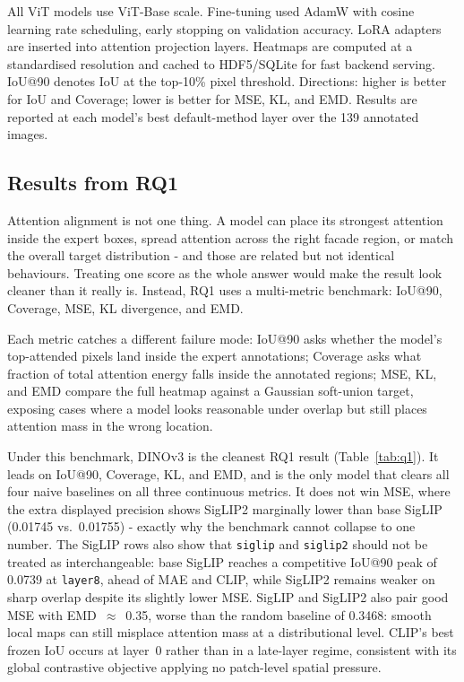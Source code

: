\documentclass[lineno,pdflatex,sn-mathphys-num]{sn-jnl}%
\theoremstyle{thmstyleone}%
\theoremstyle{thmstyletwo}%
\theoremstyle{thmstylethree}%
\begin{document}
All ViT models use ViT-Base scale. Fine-tuning used AdamW with cosine learning rate scheduling, early stopping on validation accuracy. LoRA adapters are inserted into attention projection layers. Heatmaps are computed at a standardised resolution and cached to HDF5/SQLite for fast backend serving. IoU@90 denotes IoU at the top-10\% pixel threshold. Directions: higher is better for IoU and Coverage; lower is better for MSE, KL, and EMD. Results are reported at each model's best default-method layer over the 139 annotated images.

\subsection{Results from RQ1}

Attention alignment is not one thing. A model can place its strongest attention
inside the expert boxes, spread attention across the right facade region, or
match the overall target distribution - and those are related but not identical
behaviours. Treating one score as the whole answer would make the result look
cleaner than it really is. Instead, RQ1 uses a multi-metric benchmark: IoU@90,
Coverage, MSE, KL divergence, and EMD.

Each metric catches a different failure mode: IoU@90 asks whether the model's
top-attended pixels land inside the expert annotations; Coverage asks what
fraction of total attention energy falls inside the annotated regions; MSE, KL,
and EMD compare the full heatmap against a Gaussian soft-union target, exposing
cases where a model looks reasonable under overlap but still places attention
mass in the wrong location.

Under this benchmark, DINOv3 is the cleanest RQ1 result (Table~\ref{tab:q1}).
It leads on IoU@90, Coverage, KL, and EMD, and is the only model that clears
all four naive baselines on all three continuous metrics. It does not win MSE,
where the extra displayed precision shows SigLIP2 marginally lower than base
SigLIP (0.01745 vs.\ 0.01755) - exactly why the benchmark cannot collapse
to one number. The SigLIP rows also show that \texttt{siglip} and
\texttt{siglip2} should not be treated as interchangeable: base SigLIP
reaches a competitive IoU@90 peak of 0.0739 at \texttt{layer8}, ahead of MAE
and CLIP, while SigLIP2 remains weaker on sharp overlap despite its slightly
lower MSE. SigLIP and SigLIP2 also pair good MSE with EMD~$\approx$~0.35,
worse than the random baseline of 0.3468: smooth local maps can still
misplace attention mass at a distributional level. CLIP's best frozen IoU
occurs at layer~0 rather than in a late-layer regime, consistent with its
global contrastive objective applying no patch-level spatial pressure.
\end{document}
